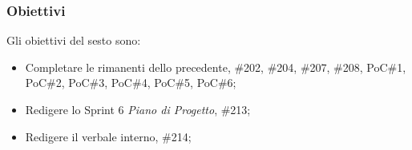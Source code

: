 \subsubsection{Obiettivi}
\label{sec:sprint6_obiettivi}
Gli obiettivi del sesto  sono:
\begin{itemize}
    \item Completare le  rimanenti dello  precedente,  \#202, \#204, \#207, \#208, PoC\#1, PoC\#2, PoC\#3, PoC\#4, PoC\#5, PoC\#6;
    \item Redigere lo Sprint 6 \textit{Piano di Progetto},  \#213;
    \item Redigere il verbale interno,  \#214;
\end{itemize}